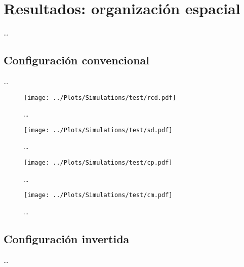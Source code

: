 \chapter{Resultados: organización espacial}
\label{cap:results}

\dots

\section{Configuración convencional}

\dots

\begin{figure}
  \centering
  \texttt{[image: ../Plots/Simulations/test/rcd.pdf]}
  \caption{\dots}
  \label{fig:rcd}
\end{figure}

\begin{figure}
  \centering
  \texttt{[image: ../Plots/Simulations/test/sd.pdf]}
  \caption{\dots}
  \label{fig:sd}
\end{figure}

\begin{figure}
  \centering
  \texttt{[image: ../Plots/Simulations/test/cp.pdf]}
  \caption{\dots}
  \label{fig:cp}
\end{figure}

\begin{figure}
  \centering
  \texttt{[image: ../Plots/Simulations/test/cm.pdf]}
  \caption{\dots}
  \label{fig:cm}
\end{figure}

\section{Configuración invertida}

\dots
